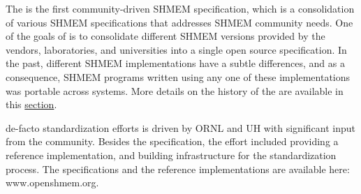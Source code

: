 The \openshmem{} is the first community-driven SHMEM specification,
which is a consolidation of various SHMEM specifications that addresses SHMEM community needs. 
One of the goals of \openshmem is to consolidate different SHMEM versions
provided by the vendors, laboratories, and universities into a single open
source specification. In the past, different SHMEM implementations have a subtle
differences, and as a consequence, SHMEM programs written using any one of these 
implementations was portable across systems. 
More details on the history of the \openshmem are available in this
\hyperref[sec:openshmem_history]{section}.

\openshmem{} de-facto standardization efforts is driven by \ac{ORNL} and \ac{UH} 
with significant input from the \openshmem{} community. Besides the
specification, the effort included providing a reference implementation,
 and building infrastructure for the standardization process.
The specifications and the reference implementations are available here: 
www.openshmem.org.

